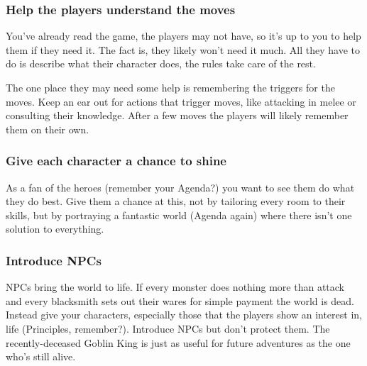  
\subsubsection{Help the players understand the moves}     
 

You've already read the game, the players may not have, so it's up to you to help them if they need it. The fact is, they likely won't need it much. All they have to do is describe what their character does, the rules take care of the rest.

 

The one place they may need some help is remembering the triggers for the moves. Keep an ear out for actions that trigger moves, like attacking in melee or consulting their knowledge. After a few moves the players will likely remember them on their own.

 
\subsubsection{Give each character a chance to shine}      
 

As a fan of the heroes (remember your Agenda?) you want to see them do what they do best. Give them a chance at this, not by tailoring every room to their skills, but by portraying a fantastic world (Agenda again) where there isn't one solution to everything.

 
\subsubsection{Introduce NPCs}    
 

NPCs bring the world to life. If every monster does nothing more than attack and every blacksmith sets out their wares for simple payment the world is dead. Instead give your characters, especially those that the players show an interest in, life (Principles, remember?). Introduce NPCs but don't protect them. The recently-deceased Goblin King is just as useful for future adventures as the one who's still alive.

 






